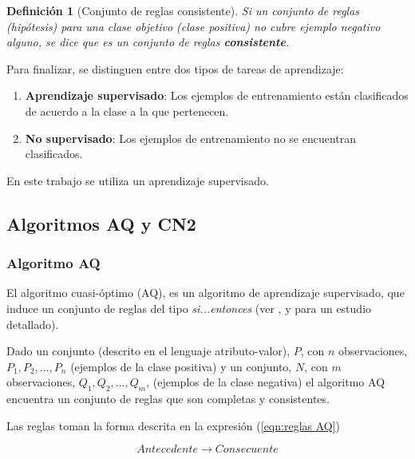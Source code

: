 \documentclass[12pt]{report}
\theoremstyle{break}
\newtheorem{definicion}{Definición}[chapter]
\theoremstyle{break}
\begin{document}
\begin{definicion}[Conjunto de reglas consistente]
\label{definicion:reglas-consistentes}
Si un conjunto de reglas (hipótesis) para una clase objetivo (clase positiva) no cubre ejemplo negativo alguno, se dice que es un conjunto de reglas \textbf{consistente}.
\end{definicion}

Para finalizar, se distinguen entre dos tipos de tareas de aprendizaje:

\begin{enumerate}
\item \textbf{Aprendizaje supervisado}: Los ejemplos de entrenamiento están clasificados de acuerdo a la clase a la que pertenecen.

\item \textbf{No supervisado}: Los ejemplos de entrenamiento no se encuentran clasificados.
\end{enumerate}

En este trabajo se utiliza un aprendizaje supervisado.

\subsection{Algoritmos AQ y CN2}
\label{seccion:algoritmos aq cn2}

\subsubsection{Algoritmo AQ}
\label{subseccion:algoritmo aq}
El algoritmo cuasi-óptimo (AQ), es un algoritmo de aprendizaje supervisado, que induce un conjunto de reglas del tipo \textit{si...entonces} (ver \cite{AQCervone2010}, \cite{AQMichalski1991} y \cite{AQWojtusiak2012} para un estudio detallado). 

Dado un conjunto (descrito en el lenguaje atributo-valor), $P$, con $n$ observaciones, $P_1, P_2, \ldots, P_n$ (ejemplos de la clase positiva)  y un conjunto, $N$, con $m$ observaciones, $Q_1, Q_2, \ldots, Q_m$, (ejemplos de la clase negativa) el algoritmo AQ encuentra un conjunto de reglas que son completas y consistentes.

Las reglas toman la forma descrita en la expresión (\ref{eqn:reglas AQ})

\begin{equation} \label{eqn:reglas AQ}
Antecedente \rightarrow Consecuente
\end{equation}
\end{document}

